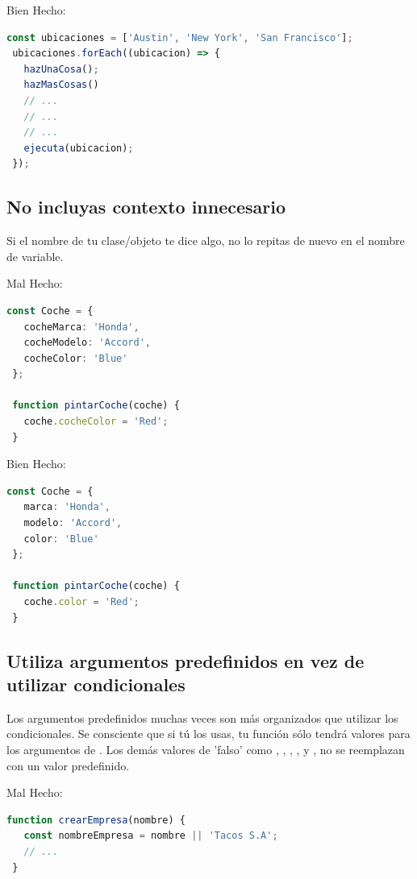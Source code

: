 \documentclass[a4paper, 12pt]{article}
\begin{document}
Bien Hecho:
\begin{lstlisting}[language=TypeScript, style=goodstyle]
 const ubicaciones = ['Austin', 'New York', 'San Francisco'];
 ubicaciones.forEach((ubicacion) => {
   hazUnaCosa();
   hazMasCosas()
   // ...
   // ...
   // ...
   ejecuta(ubicacion);
 });
\end{lstlisting}

\newpage

\subsection*{No incluyas contexto innecesario}

Si el nombre de tu clase/objeto te dice algo, no lo repitas de nuevo en el nombre de variable.

Mal Hecho:
\begin{lstlisting}[language=TypeScript, style=badstyle]
 const Coche = {
   cocheMarca: 'Honda',
   cocheModelo: 'Accord',
   cocheColor: 'Blue'
 };

 function pintarCoche(coche) {
   coche.cocheColor = 'Red';
 }
\end{lstlisting}
\vspace{0.5cm} %

Bien Hecho:
\begin{lstlisting}[language=TypeScript, style=goodstyle]
 const Coche = {
   marca: 'Honda',
   modelo: 'Accord',
   color: 'Blue'
 };

 function pintarCoche(coche) {
   coche.color = 'Red';
 }
\end{lstlisting}

\subsection*{Utiliza argumentos predefinidos en vez de utilizar condicionales}

Los argumentos predefinidos muchas veces son más organizados que utilizar los condicionales. Se consciente que si tú los usas, tu función sólo tendrá valores para los argumentos de . Los demás valores de 'falso' como \lineCode{\textquotesingle\textquotesingle}, \lineCode{\textquotedblright\textquotedblright}, , ,  y , no se reemplazan con un valor predefinido.

Mal Hecho:
\begin{lstlisting}[language=TypeScript, style=badstyle]
 function crearEmpresa(nombre) {
   const nombreEmpresa = nombre || 'Tacos S.A';
   // ...
 }
\end{lstlisting}
\vspace{0.5cm} %
\end{document}
